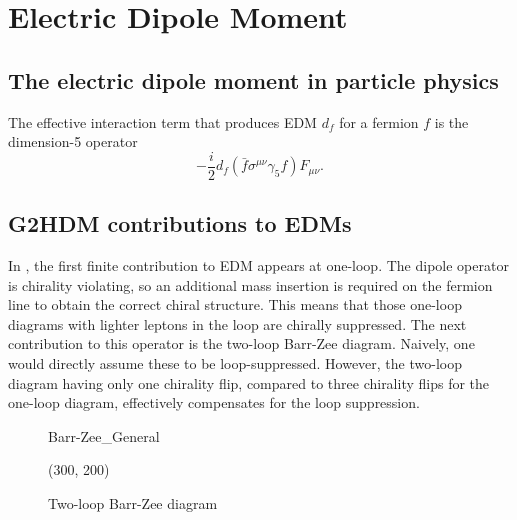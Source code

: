 \chapter{Electric Dipole Moment}
\label{ch:EDM}

\section{The electric dipole moment in particle physics}

The effective interaction term that produces EDM \(d_{f} \) for a fermion \(f \) is the dimension-5 operator
\begin{equation}
  -\frac{i}{2}d_{f}\left(\bar{f}\sigma^{\mu\nu}\gamma_{5}f\right)F_{\mu\nu}.
\end{equation}

\section{G2HDM contributions to EDMs}

In {\gthdm}, the first finite contribution to EDM appears at one-loop.
The dipole operator is chirality violating, so an additional mass insertion is required on the fermion line to obtain the correct chiral structure.
This means that those one-loop diagrams with lighter leptons in the loop are chirally suppressed.
The next contribution to this operator is the two-loop Barr-Zee diagram. 
Naively, one would directly assume these to be loop-suppressed. 
However, the two-loop diagram having only one chirality flip, compared to three chirality flips for the one-loop diagram, 
effectively compensates for the loop suppression.

\begin{figure}[p]
	\centering
	\begin{fmffile}{Barr-Zee_General}
		\begin{fmfgraph*}(300, 200)
			\fmffreeze
			\fmffreeze
		\end{fmfgraph*}
	\end{fmffile}

	\caption{Two-loop Barr-Zee diagram}
	\label{fig:BarrZee_general}
\end{figure}

